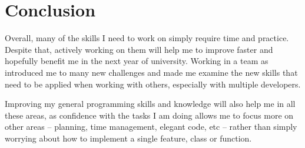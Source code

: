 \documentclass{scrartcl}
\begin{document}
\section{Conclusion}

Overall, many of the skills I need to work on simply require time and practice. Despite that, actively working on them will help me to improve faster and hopefully benefit me in the next year of university. Working in a team as introduced me to many new challenges and made me examine the new skills that need to be applied when working with others, especially with multiple developers.

Improving my general programming skills and knowledge will also help me in all these areas, as confidence with the tasks I am doing allows me to focus more on other areas – planning, time management, elegant code, etc – rather than simply worrying about how to implement a single feature, class or function.





\end{document}
